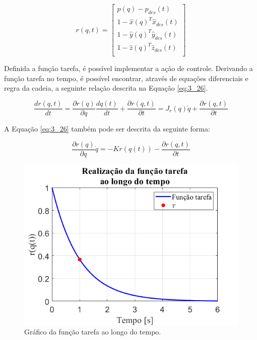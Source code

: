 \begin{equation}
r(q,t) = 
\begin{bmatrix}
p(q)-p_{des}(t)\\
1-\hat{x}(q)^T\hat{x}_{des}(t)\\
1-\hat{y}(q)^T\hat{y}_{des}(t)\\
1-\hat{z}(q)^T\hat{z}_{des}(t)\\
\end{bmatrix}
\label{eq:3_25}
\end{equation} 


Definida a função tarefa, é possível implementar a ação de controle. Derivando a função tarefa no tempo, é possível encontrar, através de equações diferenciais e regra da cadeia, a seguinte relação descrita na Equação \ref{eq:3_26}.

\begin{equation}
\frac{dr(q,t)}{dt} = \frac{\partial r(q)}{\partial q} \frac{dq(t)}{dt} + \frac{\partial r(q,t)}{\partial t}= J_r(q) \dot{q} + \frac{\partial r(q,t)}{\partial t}
\label{eq:3_26}
\end{equation}

A Equação \ref{eq:3_26} também pode ser descrita da seguinte forma:

\begin{equation}
\frac{\partial r(q)}{\partial q} \dot{q} = -Kr(q(t)) - \frac{\partial r(q,t)}{\partial t}
\label{eq:3_27}
\end{equation}

\begin{figure}[b!]
\centering
\includegraphics[width=0.7\columnwidth]{Imagens/FuncaoTarefa.png}
\caption{Gráfico da função tarefa ao longo do tempo.}
\label{fig:FuncaoTarefa}
\end{figure}


